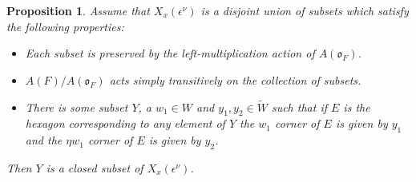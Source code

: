 \documentclass{amsart}
\newtheorem{prop}{Proposition}[subsection]
\theoremstyle{definition}
\def\O{\mathfrak{o}}
\def\e{\epsilon}
\def\W{\widetilde{W}}
\def\A{A(\O_F)}
\def\en{\e^{\nu}}
\def\X{X_x(\en)}
\begin{document}
  \begin{prop}
    \label{prop:closedness-of-hexagon-piece}
    Assume that $\X$ is a disjoint union of subsets which satisfy the following
    properties:
    \begin{itemize}
      \item Each subset is preserved by the left-multiplication action of
	$\A$.
      \item $A(F)/\A$ acts simply transitively on the collection of subsets.
      \item There is some subset $Y$, a $w_1 \in W$ and $y_1, y_2 \in \W$ such
	that if $E$ is the hexagon corresponding to any element of $Y$ the
	$w_1$ corner of $E$ is given by $y_1$ and the $\eta w_1$ corner of $E$
	is given by $y_2$.
    \end{itemize}
    Then $Y$ is a closed subset of $\X$.
  \end{prop}
\end{document}
